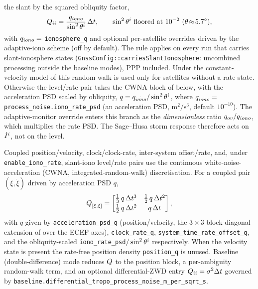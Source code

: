 \documentclass[main.tex]{subfiles}
\begin{document}
the slant by the squared obliquity factor,
\begin{equation}
\Qmat_{ii}
  = \frac{\spd{\mathrm{iono}}}{\sin^2\theta^{\sat}}\,\dt,
\qquad
\sin^2\theta^{\sat} \ \text{floored at } 10^{-2}\ (\theta\!\approx\!5.7^\circ),
\label{eq:kf-Q-iono}
\end{equation}
with $q_{iono} = $ \texttt{ionosphere\_q} and optional
per-satellite overrides driven by the adaptive-iono scheme (off by default).
The rule applies on every run that carries slant-ionosphere states
(\texttt{GnssConfig::carriesSlantIonosphere}: uncombined processing outside
the baseline modes), PPP included.  Under the
constant-velocity model of  this random walk is used
only for satellites without a rate state.  Otherwise the level/rate pair
takes the CWNA block of  below, with the acceleration
PSD scaled by obliquity,
$q = q_{\dot{iono}}/\sin^2\theta^{i}$, where
$q_{\dot{iono}} = $ \texttt{process\_noise.iono\_rate\_psd}
(an acceleration PSD, $\mathrm{m}^2/\mathrm{s}^3$, default $10^{-10}$).
The adaptive-monitor override enters this branch as the
\emph{dimensionless} ratio $q_{ov}/q_{iono}$, which
multiplies the rate PSD.  The Sage--Husa storm response therefore acts
on $\dot I^{i}$, not on the level.

Coupled position/velocity, clock/clock-rate, inter-system offset/rate,
and, under \texttt{enable\_iono\_rate}, slant-iono level/rate pairs
use the continuous white-noise-acceleration (CWNA,
integrated-random-walk) discretisation.  For a coupled pair $(\xi,
\dot\xi)$ driven by acceleration PSD $q$,
\begin{equation}
Q_{[\xi,\dot\xi]}
  =
  \begin{bmatrix}
    \tfrac{1}{3}\,q\,\Delta t^{3} & \tfrac{1}{2}\,q\,\Delta t^{2} \\[2pt]
    \tfrac{1}{2}\,q\,\Delta t^{2} & q\,\Delta t
  \end{bmatrix},
\label{eq:kf-Q-cwna}
\end{equation}
with $q$ given by \texttt{acceleration\_psd\_q} (position/velocity, the
$3\times3$ block-diagonal extension of  over the ECEF
axes), \texttt{clock\_rate\_q}, \texttt{system\_time\_rate\_offset\_q},
and the obliquity-scaled \texttt{iono\_rate\_psd}$/\sin^2\theta^{i}$
respectively.  When the velocity state is present the rate-free
position density \texttt{position\_q} is unused.  Baseline
(double-difference) mode reduces $Q$ to the position block, a
per-ambiguity random-walk term, and an optional differential-ZWD entry
$Q_{ii} = \sigma^2\Delta t$ governed by
\texttt{baseline.differential\_tropo\_process\_noise\_m\_per\_sqrt\_s}.
\end{document}

